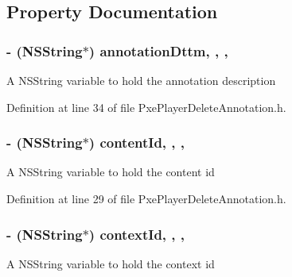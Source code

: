 \subsection{Property Documentation}
\hypertarget{interface_pxe_player_delete_annotation_a929f2f2c876d9d89cda682c8a4e3f3da}{
\subsubsection[{annotation\-Dttm}]{\setlength{\rightskip}{0pt plus 5cm}-\/ (N\-S\-String$\ast$) annotation\-Dttm\hspace{0.3cm}{\ttfamily [read]}, {\ttfamily [write]}, {\ttfamily [nonatomic]}, {\ttfamily [strong]}}}\label{interface_pxe_player_delete_annotation_a929f2f2c876d9d89cda682c8a4e3f3da}
A N\-S\-String variable to hold the annotation description 

Definition at line 34 of file Pxe\-Player\-Delete\-Annotation.\-h.

\hypertarget{interface_pxe_player_delete_annotation_a370a323136369e89ce703c8811a87a3c}{
\subsubsection[{content\-Id}]{\setlength{\rightskip}{0pt plus 5cm}-\/ (N\-S\-String$\ast$) content\-Id\hspace{0.3cm}{\ttfamily [read]}, {\ttfamily [write]}, {\ttfamily [nonatomic]}, {\ttfamily [strong]}}}\label{interface_pxe_player_delete_annotation_a370a323136369e89ce703c8811a87a3c}
A N\-S\-String variable to hold the content id 

Definition at line 29 of file Pxe\-Player\-Delete\-Annotation.\-h.

\hypertarget{interface_pxe_player_delete_annotation_af7e0af27ae414509ba43e44ddf7667a2}{
\subsubsection[{context\-Id}]{\setlength{\rightskip}{0pt plus 5cm}-\/ (N\-S\-String$\ast$) context\-Id\hspace{0.3cm}{\ttfamily [read]}, {\ttfamily [write]}, {\ttfamily [nonatomic]}, {\ttfamily [strong]}}}\label{interface_pxe_player_delete_annotation_af7e0af27ae414509ba43e44ddf7667a2}
A N\-S\-String variable to hold the context id 

